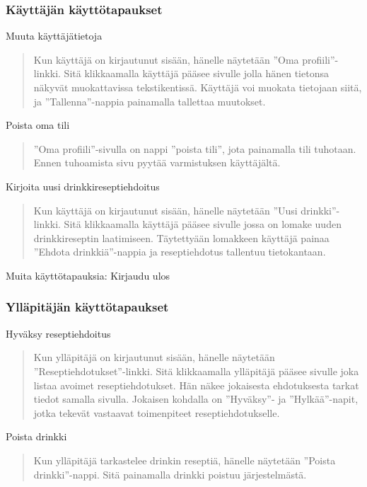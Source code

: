\documentclass[a4paper]{article}
\begin{document}
\subsubsection{Käyttäjän käyttötapaukset}
Muuta käyttäjätietoja
\begin{quote}
  Kun käyttäjä on kirjautunut sisään, hänelle näytetään ''Oma profiili''-linkki. Sitä klikkaamalla käyttäjä pääsee sivulle jolla hänen tietonsa näkyvät muokattavissa tekstikentissä. Käyttäjä voi muokata tietojaan siitä, ja ''Tallenna''-nappia painamalla tallettaa muutokset.
\end{quote}
Poista oma tili
\begin{quote}
  ''Oma profiili''-sivulla on nappi ''poista tili'', jota painamalla tili tuhotaan. Ennen tuhoamista sivu pyytää varmistuksen käyttäjältä.
\end{quote}
Kirjoita uusi drinkkireseptiehdoitus
\begin{quote}
  Kun käyttäjä on kirjautunut sisään, hänelle näytetään ''Uusi drinkki''-linkki. Sitä klikkaamalla käyttäjä pääsee sivulle jossa on lomake uuden drinkkireseptin laatimiseen. Täytettyään lomakkeen käyttäjä painaa ''Ehdota drinkkiä''-nappia ja reseptiehdotus tallentuu tietokantaan.
\end{quote}
Muita käyttötapauksia: Kirjaudu ulos
\subsubsection{Ylläpitäjän käyttötapaukset}
Hyväksy reseptiehdoitus
\begin{quote}
  Kun ylläpitäjä on kirjautunut sisään, hänelle näytetään ''Reseptiehdotukset''-linkki. Sitä klikkaamalla ylläpitäjä pääsee sivulle joka listaa avoimet reseptiehdotukset. Hän näkee jokaisesta ehdotuksesta tarkat tiedot samalla sivulla. Jokaisen kohdalla on ''Hyväksy''- ja ''Hylkää''-napit, jotka tekevät vastaavat toimenpiteet reseptiehdotukselle.
\end{quote}
Poista drinkki
\begin{quote}
  Kun ylläpitäjä tarkastelee drinkin reseptiä, hänelle näytetään ''Poista drinkki''-nappi. Sitä painamalla drinkki poistuu järjestelmästä.
\end{quote}
\end{document}

